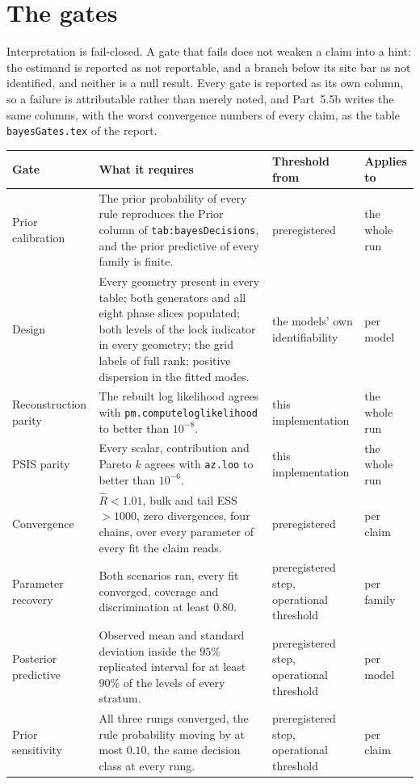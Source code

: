 \documentclass[10pt,a4paper]{article}
\newcommand{\code}[1]{\texttt{\UseBreakableUnderscores #1}}
\newcommand{\UseBreakableUnderscores}{\def\_{\textunderscore\allowbreak}}
\begin{document}
\section{The gates}
Interpretation is fail-closed. A gate that fails does not weaken a claim into a hint: the estimand is reported as not reportable, and a branch below its site bar as not identified, and neither is a null result. Every gate is reported as its own column, so a failure is attributable rather than merely noted, and Part~5.5b writes the same columns, with the worst convergence numbers of every claim, as the table \code{bayesGates.tex} of the report.

\begin{center}\small
\begin{longtable}{@{}L{2.9cm}L{6.9cm}L{2.9cm}L{2.7cm}@{}}
\toprule
\textbf{Gate} & \textbf{What it requires} & \textbf{Threshold from} & \textbf{Applies to}\\
\midrule\endhead
Prior calibration & The prior probability of every rule reproduces the Prior column of \code{tab:bayesDecisions}, and the prior predictive of every family is finite. & preregistered & the whole run\\
Design & Every geometry present in every table; both generators and all eight phase slices populated; both levels of the lock indicator in every geometry; the grid labels of full rank; positive dispersion in the fitted modes. & the models' own identifiability & per model\\
Reconstruction parity & The rebuilt log likelihood agrees with \code{pm.compute\_log\_likelihood} to better than $10^{-8}$. & this implementation & the whole run\\
PSIS parity & Every scalar, contribution and Pareto $k$ agrees with \code{az.loo} to better than $10^{-6}$. & this implementation & the whole run\\
Convergence & $\hat R<1.01$, bulk and tail ESS $>1000$, zero divergences, four chains, over every parameter of every fit the claim reads. & preregistered & per claim\\
Parameter recovery & Both scenarios ran, every fit converged, coverage and discrimination at least $0.80$. & preregistered step, operational threshold & per family\\
Posterior predictive & Observed mean and standard deviation inside the $95\%$ replicated interval for at least $90\%$ of the levels of every stratum. & preregistered step, operational threshold & per model\\
Prior sensitivity & All three rungs converged, the rule probability moving by at most $0.10$, the same decision class at every rung. & preregistered step, operational threshold & per claim\\

\end{longtable}
\end{center}
\end{document}

